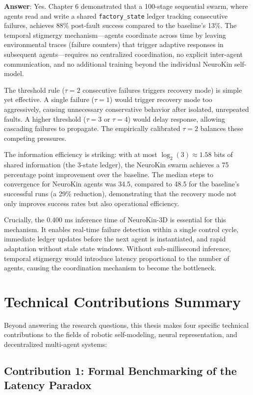 ﻿\documentclass[12pt,a4paper,oneside]{report}
\begin{document}
\textbf{Answer}: Yes. Chapter 6 demonstrated that a 100-stage sequential swarm, where agents read and write a shared \texttt{factory\_state} ledger tracking consecutive failures, achieves 88\% post-fault success compared to the baseline's 13\%. The temporal stigmergy mechanism---agents coordinate across time by leaving environmental traces (failure counters) that trigger adaptive responses in subsequent agents---requires no centralized coordination, no explicit inter-agent communication, and no additional training beyond the individual NeuroKin self-model.

The threshold rule ($\tau = 2$ consecutive failures triggers recovery mode) is simple yet effective. A single failure ($\tau = 1$) would trigger recovery mode too aggressively, causing unnecessary conservative behavior after isolated, unrepeated faults. A higher threshold ($\tau = 3$ or $\tau = 4$) would delay response, allowing cascading failures to propagate. The empirically calibrated $\tau = 2$ balances these competing pressures.

The information efficiency is striking: with at most $\log_2(3) \approx 1.58$ bits of shared information (the 3-state ledger), the NeuroKin swarm achieves a 75 percentage point improvement over the baseline. The median steps to convergence for NeuroKin agents was 34.5, compared to 48.5 for the baseline's successful runs (a 29\% reduction), demonstrating that the recovery mode not only improves success rates but also operational efficiency.

Crucially, the 0.400 ms inference time of NeuroKin-3D is essential for this mechanism. It enables real-time failure detection within a single control cycle, immediate ledger updates before the next agent is instantiated, and rapid adaptation without stale state windows. Without sub-millisecond inference, temporal stigmergy would introduce latency proportional to the number of agents, causing the coordination mechanism to become the bottleneck.

\section{Technical Contributions Summary}

Beyond answering the research questions, this thesis makes four specific technical contributions to the fields of robotic self-modeling, neural representation, and decentralized multi-agent systems:

\subsection{Contribution 1: Formal Benchmarking of the Latency Paradox}
\end{document}

